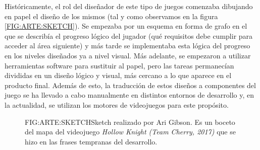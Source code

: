 Históricamente, el rol del diseñador de este tipo de juegos comenzaba dibujando en papel el diseño de los mismos (tal y como observamos en la figura \ref{FIG:ARTE:SKETCH}). Se empezaba por un esquema en forma de grafo en el que se describía el progreso lógico del jugador (qué requisitos debe cumplir para acceder al área siguiente) y más tarde se implementaba esta lógica del progreso en los niveles diseñados ya a nivel visual.
Más adelante, se empezaron a utilizar herramientas software para sustituir al papel, pero las tareas permanecían divididas en un diseño lógico y visual, más cercano a lo que aparece en el producto final.
Además de esto, la traducción de estos diseños a componentes del juego se ha llevado a cabo manualmente en distintos entornos de desarrollo y, en la actualidad, se utilizan los motores de videojuegos para este propósito.

\begin{figure}{FIG:ARTE:SKETCH}{Sketch realizado por Ari Gibson. Es un boceto del mapa del videojuego  \textit{Hollow Knight\cite{hollowknight} (Team Cherry, 2017)} que se hizo en las frases tempranas del desarrollo.}
\end{figure}